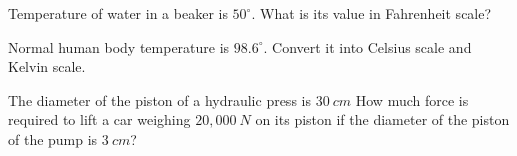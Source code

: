 \documentclass[14pt]{exam}
\begin{document}
\begin{questions}
\question[5] Temperature of water in a beaker is $50^{\circ}$. What is its value in Fahrenheit scale?
\addpoints

\question[10] Normal human body temperature is $98.6^{\circ}$. Convert it into Celsius scale and Kelvin scale.
\addpoints

\question[10] The diameter of the piston of a hydraulic press is $30 \ cm$ How much force is required to lift a car weighing $20,000 \ N$ on its piston if the diameter of the piston of the pump is $3 \ cm$?
\addpoints


\end{questions}
\end{document}
